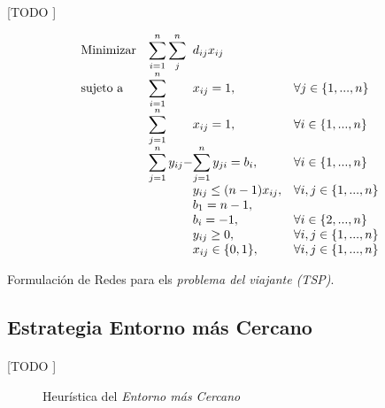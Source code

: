 \documentclass[spanish]{article}
\begin{document}
				\paragraph{}
				[TODO ]

				\begin{eqfloat}
					\begin{equation}
						\begin{array}{ll@{}ll}
							\text{Minimizar}	& \displaystyle\sum\limits_{i = 1}^{n}\sum\limits_{j}^{n} & d_{ij}x_{ij} &\\
							\text{sujeto a}		& \displaystyle\sum\limits_{i = 1}^{n}	&	x_{ij} 	= 1,  & \forall j \in \{1,...,n\}\\
																& \displaystyle\sum\limits_{j = 1}^{n}	&	x_{ij} 	= 1,  & \forall i \in \{1,...,n\}\\
																& \displaystyle\sum\limits_{j = 1}^n	y_{ij} - &\displaystyle\sum\limits_{j = 1}^n	y_{ji} = b_{i},  & \forall i \in \{1,...,n\} \\
																&                               &	y_{ij}  \leq (n-1)x_{ij}, 	&  \forall i,j \in \{1,...,n\}\\
																&                               &	b_{1}  = n - 1, 	& \\
																&                               &	b_{i} = -1, 		& \forall i \in \{2,...,n\} \\
																&                               &	y_{ij} \geq 0, 		& \forall i,j \in \{1,...,n\} \\
																&                               &	x_{ij} \in \{0,1\}, 	& \forall i,j \in \{1,...,n\}
						\end{array}
					\end{equation}
					\caption{Formulación de Redes para els \emph{problema del viajante (TSP)}.}
					\label{eq:tsp_redes}
				\end{eqfloat}


		\subsection{Estrategia Entorno más Cercano}

			\paragraph{}
			[TODO ]

			\begin{figure}
	      \centering
	      \caption{Heurística del \emph{Entorno más Cercano}}
	      \label{code:tsp-greedy}
	    \end{figure}
\end{document}
